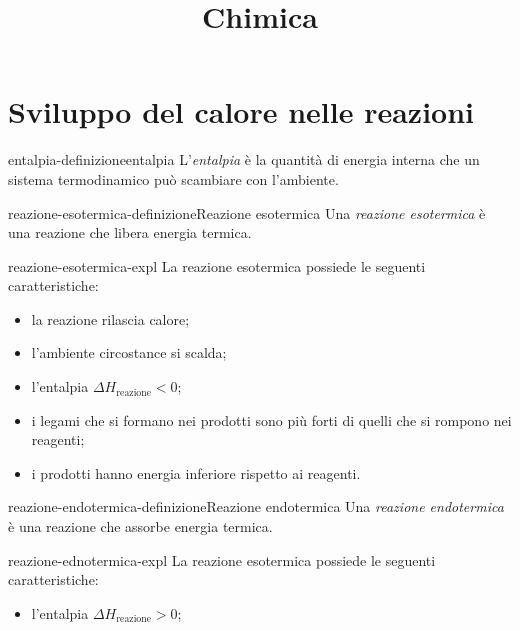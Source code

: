 \documentclass[preview]{standalone}
\begin{document}
\title{Chimica}
\genpage

\section{Sviluppo del calore nelle reazioni}



\begin{snippetdefinition}{entalpia-definizione}{entalpia}
    L'\textit{entalpia} è la quantità di energia interna che un sistema
    termodinamico può scambiare con l'ambiente.
\end{snippetdefinition}

\begin{snippetdefinition}{reazione-esotermica-definizione}{Reazione esotermica}
    Una \textit{reazione esotermica} è una reazione che libera energia termica.
\end{snippetdefinition}

\begin{snippet}{reazione-esotermica-expl}
    La reazione esotermica possiede le seguenti caratteristiche:
    \begin{itemize}
        \item la reazione rilascia calore;
        \item l'ambiente circostance si scalda;
        \item l'entalpia \(\Delta H_{\text{reazione}} < 0\);
        \item i legami che si formano nei prodotti sono più forti di quelli che si rompono nei reagenti;
        \item i prodotti hanno energia inferiore rispetto ai reagenti.
    \end{itemize}
\end{snippet}

\begin{snippetdefinition}{reazione-endotermica-definizione}{Reazione endotermica}
    Una \textit{reazione endotermica} è una reazione che assorbe energia termica.
\end{snippetdefinition}

\begin{snippet}{reazione-ednotermica-expl}
    La reazione esotermica possiede le seguenti caratteristiche:
    \begin{itemize}
        \item l'entalpia \(\Delta H_{\text{reazione}} > 0\);
    \end{itemize}
\end{snippet}
\end{document}

